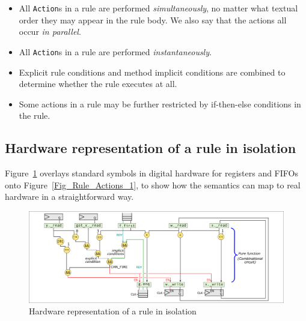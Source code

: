\begin{itemize}

 \item All \verb|Action|s in a rule are performed
       \emph{simultaneously}, no matter what textual order they may
       appear in the rule body.  We also say that the actions all
       occur \emph{in parallel}.

 \item All \verb|Action|s in a rule are performed
       \emph{instantaneously}.

 \item Explicit rule conditions and method implicit conditions are
       combined to determine whether the rule executes at all.

 \item Some actions in a rule may be further restricted by
       if-then-else conditions in the rule.

\end{itemize}




\subsection{Hardware representation of a rule in isolation}

\label{Sec_HW_representation_of_a_rule}

Figure~\ref{Fig_Rule_Actions_1_2} overlays standard symbols in digital
hardware for registers and FIFOs onto Figure~\ref{Fig_Rule_Actions_1},
to show how the semantics can map to real hardware in a
straightforward way.
\begin{figure}[htbp]
  \centerline{\includegraphics[width=6in,angle=0]{Figures/Fig_Rule_Actions_1_2}}
  \caption{\label{Fig_Rule_Actions_1_2} Hardware representation of a rule in isolation}
\end{figure}

